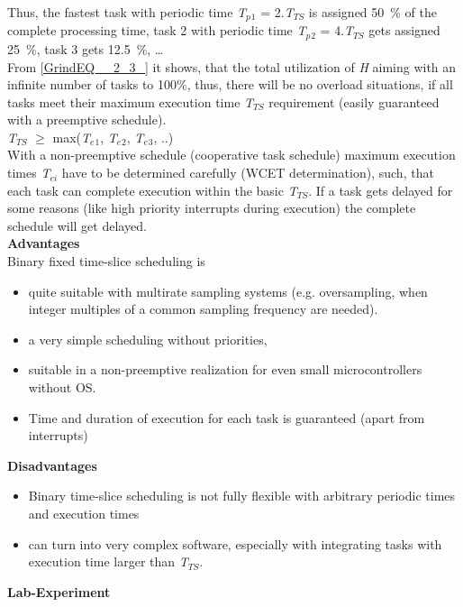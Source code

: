 Thus, the fastest task with periodic time \textit{T${}_{p}$}${}_{1}$ = 2$.$\textit{T}${}_{TS}$ is assigned 50~\% of the complete processing time, task 2 with periodic time \textit{T${}_{p}$}${}_{2}$ = 4$.$\textit{T}${}_{TS}$ gets assigned 25~\%, task 3 gets 12.5~\%, {\dots}\\

From \eqref{GrindEQ__2_3_} it shows, that the total utilization of \textit{H} aiming with an infinite number of tasks to 100\%, thus, there will be no overload situations, if all tasks meet their maximum execution time \textit{T${}_{TS}$} requirement (easily guaranteed with a preemptive schedule).\\

\textit{   T${}_{TS}$} $\mathrm{\ge}$ max(\textit{T${}_{e}$}${}_{1}$,\textit{ T${}_{e}$}${}_{2}$,\textit{ T${}_{e}$}${}_{3}$, ..)\\

With a non-preemptive schedule (cooperative task schedule) maximum execution times \textit{T${}_{ei}$} have to be determined carefully (WCET determination), such, that each task can complete execution within the basic \textit{T${}_{TS}$}. If a task gets delayed for some reasons (like high priority interrupts during execution) the complete schedule will get delayed.\\

\textbf{Advantages }\\

Binary fixed time-slice scheduling is

\begin{itemize}
	\item  quite suitable with multirate sampling systems (e.g. oversampling, when integer multiples of a common sampling frequency are needed).
	\item  a very simple scheduling without priorities,
	\item  suitable in a non-preemptive realization for even small microcontrollers without OS. 
	\item  Time and duration of execution for each task is guaranteed (apart from interrupts)
\end{itemize}

\textbf{Disadvantages }

\begin{itemize}
	\item \textbf{ }Binary time-slice scheduling is not fully flexible with arbitrary periodic times and execution times
	\item  can turn into very complex software, especially with integrating tasks with execution time larger than \textit{T${}_{TS}$}.
\end{itemize}
\newpage
\textbf{Lab-Experiment}   \textbf{}

